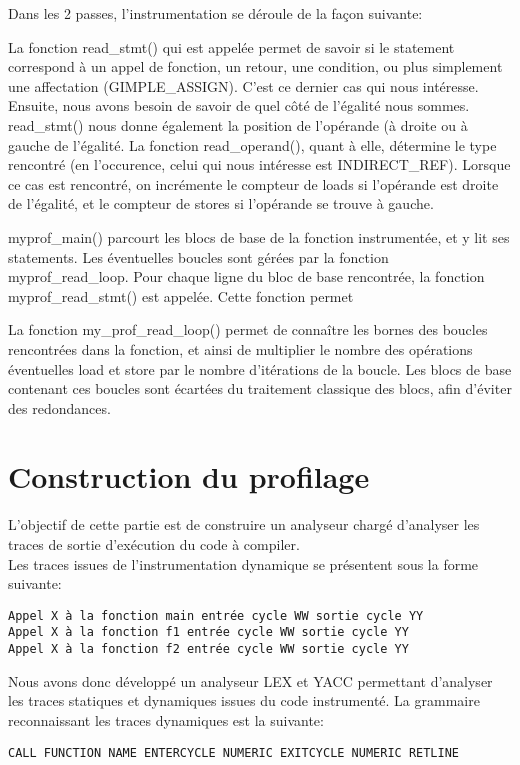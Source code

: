 \documentclass[oneside,11pt]{article}
\begin{document}
Dans les 2 passes, l'instrumentation se déroule de la façon suivante:

La fonction read\_stmt() qui est appelée permet de savoir si le statement correspond à un appel de fonction, un retour, une condition, ou plus simplement une affectation (GIMPLE\_ASSIGN). C'est ce dernier cas qui nous intéresse.
Ensuite, nous avons besoin de savoir de quel côté de l'égalité nous sommes. read\_stmt() nous donne également la position de l'opérande (à droite ou à gauche de l'égalité. La fonction read\_operand(), quant à elle, détermine le type rencontré (en l'occurence, celui qui nous intéresse est INDIRECT\_REF).
Lorsque ce cas est rencontré, on incrémente le compteur de loads si l'opérande est droite de l'égalité, et le compteur de stores si l'opérande se trouve à gauche.

myprof\_main() parcourt les blocs de base de la fonction instrumentée, et y lit ses statements. Les éventuelles boucles sont gérées par la fonction myprof\_read\_loop.
Pour chaque ligne du bloc de base rencontrée, la fonction myprof\_read\_stmt() est appelée. Cette fonction permet 

La fonction my\_prof\_read\_loop() permet de connaître les bornes des boucles rencontrées dans la fonction, et ainsi de multiplier le nombre des opérations éventuelles load et store par le nombre d'itérations de la boucle. Les blocs de base contenant ces boucles sont écartées du traitement classique des blocs, afin d'éviter des redondances.

\section{Construction du profilage}

L'objectif de cette partie est de construire un analyseur chargé d'analyser les traces de sortie d'exécution du code à compiler.\\

Les traces issues de l'instrumentation dynamique se présentent sous la forme suivante:
\begin{verbatim}
Appel X à la fonction main entrée cycle WW sortie cycle YY
Appel X à la fonction f1 entrée cycle WW sortie cycle YY
Appel X à la fonction f2 entrée cycle WW sortie cycle YY
\end{verbatim}

Nous avons donc développé un analyseur LEX et YACC permettant d'analyser les traces statiques et dynamiques issues du code instrumenté.
La grammaire reconnaissant les traces dynamiques est la suivante:
\begin{verbatim}
CALL FUNCTION NAME ENTERCYCLE NUMERIC EXITCYCLE NUMERIC RETLINE
\end{verbatim}
\end{document}

